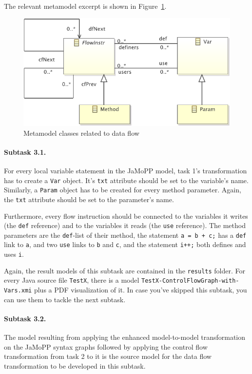 \documentclass[10pt]{article}
\begin{document}
The relevant metamodel excerpt is shown in Figure~\ref{fig:data-flow-mm}.

\begin{figure}[h!]
  \centering
  \includegraphics[width=0.6\linewidth]{../metamodel/DataFlowGraph}
  \caption{Metamodel classes related to data flow}
  \label{fig:data-flow-mm}
\end{figure}

\paragraph{Subtask 3.1.}
\label{sec:subtask-3.1}

For every local variable statement in the JaMoPP model, task 1's transformation
has to create a \verb|Var| object.  It's \verb|txt| attribute should be set to
the variable's name.  Similarly, a \verb|Param| object has to be created for
every method parameter.  Again, the \verb|txt| attribute should be set to the
parameter's name.

Furthermore, every flow instruction should be connected to the variables it
writes (the \verb|def| reference) and to the variables it reads (the \verb|use|
reference).  The method parameters are the \verb|def|-list of their method, the
statement \verb|a = b + c;| has a \verb|def| link to \verb|a|, and two
\verb|use| links to \verb|b| and \verb|c|, and the statement \verb|i++;| both
defines and uses \verb|i|.

Again, the result models of this subtask are contained in the \verb|results|
folder.  For every Java source file \verb|TestX|, there is a model
\verb|TestX-ControlFlowGraph-with-Vars.xmi| plus a PDF visualization of it.  In
case you've skipped this subtask, you can use them to tackle the next subtask.

\paragraph{Subtask 3.2.}
\label{sec:subtask-3.2}

The model resulting from applying the enhanced model-to-model transformation on
the JaMoPP syntax graphs followed by applying the control flow transformation
from task 2 to it is the source model for the data flow transformation to be
developed in this subtask.
\end{document}
